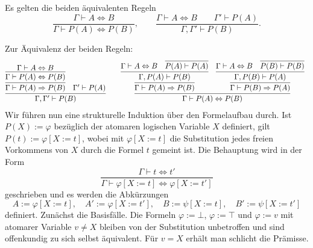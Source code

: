 \newpage
\begin{Satz}[Ersetzungsregel]
Es gelten die beiden äquivalenten Regeln
\[\dfrac{\Gamma\vdash A\Leftrightarrow B}{\Gamma\vdash P(A)\Leftrightarrow P(B)},
\qquad\dfrac{\Gamma\vdash A\Leftrightarrow B\qquad\Gamma'\vdash P(A)}{\Gamma,\Gamma'\vdash P(B)}.
\]
\end{Satz}
\begin{Beweis}
Zur Äquivalenz der beiden Regeln:
\[
\begin{array}{@{}l@{\qquad}l}
\infer{\Gamma,\Gamma'\vdash P(B)}{
  \infer{\Gamma\vdash P(A)\Rightarrow P(B)}{
    \infer{\Gamma\vdash P(A)\Leftrightarrow P(B)}{
      \Gamma\vdash A\Leftrightarrow B}}
& \Gamma'\vdash P(A)}
&
\infer{\Gamma\vdash P(A)\Leftrightarrow P(B)}{
  \infer{\Gamma\vdash P(A)\Rightarrow P(B)}{
    \infer{\Gamma, P(A)\vdash P(B)}{
      \Gamma\vdash A\Leftrightarrow B
    & \infer{P(A)\vdash P(A)}{}}}
& \infer{\Gamma\vdash P(B)\Rightarrow P(A)}{
    \infer{\Gamma, P(B)\vdash P(A)}{
      \Gamma\vdash A\Leftrightarrow B
    & \infer{P(B)\vdash P(B)}{}}}}
\end{array}
\]
Wir führen nun eine strukturelle Induktion über den Formelaufbau durch.
Ist $P(X):=\varphi$ bezüglich der atomaren logischen Variable $X$
definiert, gilt $P(t):=\varphi[X{:=}t]$, wobei mit $\varphi[X{:=}t]$
die Substitution jedes freien Vorkommens von $X$ durch die Formel $t$
gemeint ist. Die Behauptung wird in der Form
\[\dfrac{\Gamma\vdash t\Leftrightarrow t'}{
\Gamma\vdash\varphi[X{:=}t]\Leftrightarrow\varphi[X{:=}t']}\]
geschrieben und es werden die Abkürzungen
\[A:=\varphi[X{:=}t],\quad A':=\varphi[X{:=}t'],\quad B:=\psi[X{:=}t],
\quad B':=\psi[X{:=}t']\]
definiert. Zunächst die Basisfälle. Die Formeln $\varphi:=\bot$,
$\varphi:=\top$ und $\varphi:=v$ mit atomarer Variable $v\ne X$
bleiben von der Substitution unbetroffen und sind offenkundig zu sich
selbst äquivalent. Für $v=X$ erhält man schlicht die Prämisse.


\end{Beweis}
